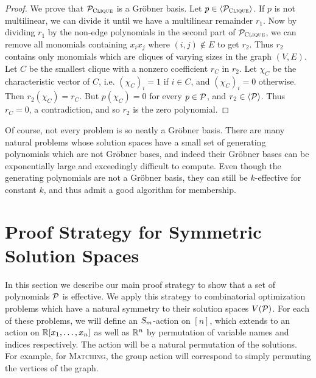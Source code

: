 \begin{proof}
We prove that $\mathcal P_{\textsc{Clique}}$ is a Gr\"obner basis. Let $p \in \langle \mathcal P_{\textsc{Clique}} \rangle$. If $p$ is not multilinear, we can divide it until we have a multilinear
remainder $r_1$. Now by dividing $r_1$ by the non-edge polynomials in the second part of $\mathcal P_{\textsc{Clique}}$, we can remove all monomials containing $x_ix_j$ where $(i,j) \notin E$
to get $r_2$. Thus $r_2$ contains only monomials which are cliques of varying sizes in the graph $(V,E)$. Let $C$ be the smallest clique with a
nonzero coefficient $r_C$ in $r_2$. Let $\chi_C$ be the characteristic vector of $C$, i.e. $(\chi_C)_i = 1$ if $i \in C$, and $(\chi_C)_i = 0$ otherwise.
Then $r_2(\chi_C) = r_C$. But $p(\chi_C) = 0$ for every $p \in \mathcal P$, and $r_2 \in \langle \mathcal P \rangle$. Thus $r_C = 0$, a contradiction, and so $r_2$ is the 
zero polynomial.
\end{proof}

Of course, not every problem is so neatly a Gr\"obner basis. There are many natural problems whose solution spaces have a small set of generating
polynomials which are not Gr\"obner bases, and indeed their Gr\"obner bases can be exponentially large and exceedingly difficult to compute. 
Even though the generating polynomials are not a Gr\"obner basis, they can still be $k$-effective for constant $k$, and thus admit a good algorithm for membership.

\section{Proof Strategy for Symmetric Solution Spaces}
In this section we describe our main proof strategy to show that a set of polynomials $\mathcal P$ is effective. 
We apply this strategy to combinatorial optimization problems which have a natural symmetry to their solution spaces $V(\mathcal P)$. 
For each of these problems, we will define an $S_{m}$-action on $[n]$, which extends to an action on $\mathbb R[x_1,\dots,x_n]$ as well as $\mathbb R^n$ by permutation of variable names and indices respectively. 
The action will be a natural permutation of the solutions. For example, for \textsc{Matching}, the group action will correspond to simply permuting the vertices of the graph. 

